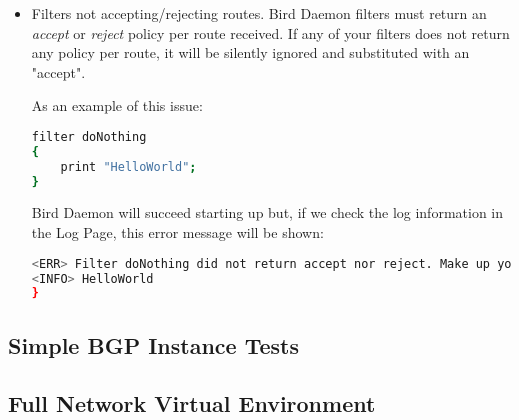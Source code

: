 \begin{itemize}
\item Filters not accepting/rejecting routes.
Bird Daemon filters must return an \textit{accept} or \textit{reject} policy per route received. If any of your filters does not return any policy per route, it will be silently ignored and substituted with an "accept".

As an example of this issue:
\begin{lstlisting}[language=bash, caption={Filter printing message}]
filter doNothing
{
    print "HelloWorld";
}
\end{lstlisting}

Bird Daemon will succeed starting up but, if we check the log information in the Log Page, this error message will be shown:
\begin{lstlisting}[language=bash, caption={Filter printing message}]
<ERR> Filter doNothing did not return accept nor reject. Make up your mind
<INFO> HelloWorld
}
\end{lstlisting}

\end{itemize}

\subsection{Simple BGP Instance Tests}

\subsection{Full Network Virtual Environment}
